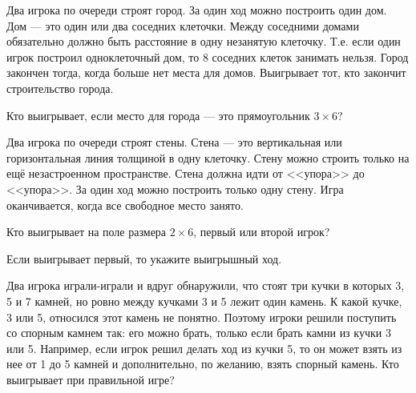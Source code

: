 \begin{problem}

Два игрока по очереди строят город. За один ход можно построить один дом. Дом --- это один или два соседних клеточки. Между соседними домами обязательно должно быть расстояние в одну незанятую клеточку. Т.е. если один игрок построил одноклеточный дом, то 8 соседних клеток занимать нельзя. Город закончен тогда, когда больше нет места для домов. Выигрывает тот, кто закончит строительство города.

Кто выигрывает, если место для города --- это прямоугольник $3\times 6$?



\begin{sol}

\end{sol}
\end{problem}




\begin{problem}

Два игрока по очереди строят стены. Стена --- это вертикальная или горизонтальная линия толщиной в одну клеточку. Стену можно строить только на ещё незастроенном пространстве. Стена должна идти от <<упора>> до <<упора>>. За один ход можно построить только одну стену. Игра оканчивается, когда все свободное место занято.

Кто выигрывает на поле размера $2\times 6$, первый или второй игрок?

Если выигрывает первый, то укажите выигрышный ход.



\begin{sol}

\end{sol}
\end{problem}




\begin{problem}

Два игрока играли-играли и вдруг обнаружили, что стоят три кучки в которых 3, 5 и 7 камней, но ровно между кучками 3 и 5 лежит один камень. К какой кучке, 3 или 5, относился этот камень не понятно. Поэтому игроки решили поступить со спорным камнем так: его можно брать, только если брать камни из кучки 3 или 5. Например, если игрок решил делать ход из кучки 5, то он может взять из нее от 1 до 5 камней и дополнительно, по желанию, взять спорный камень. Кто выигрывает при правильной игре?



\begin{sol}

\end{sol}
\end{problem}






